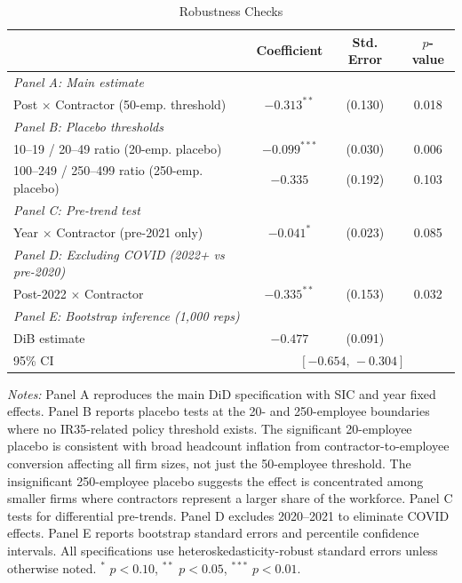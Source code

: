 \begin{table}[htbp]
\centering
\caption{Robustness Checks}
\label{tab:robust}
\begin{tabular}{lccc}
\hline\hline
 & Coefficient & Std. Error & $p$-value \\
\hline
\textit{Panel A: Main estimate} & & & \\
Post $\times$ Contractor (50-emp. threshold) & $-0.313^{**}$ & (0.130) & 0.018 \\[6pt]
\textit{Panel B: Placebo thresholds} & & & \\
10--19 / 20--49 ratio (20-emp. placebo) & $-0.099^{***}$ & (0.030) & 0.006 \\
100--249 / 250--499 ratio (250-emp. placebo) & $-0.335$ & (0.192) & 0.103 \\[6pt]
\textit{Panel C: Pre-trend test} & & & \\
Year $\times$ Contractor (pre-2021 only) & $-0.041^{*}$ & (0.023) & 0.085 \\[6pt]
\textit{Panel D: Excluding COVID (2022+ vs pre-2020)} & & & \\
Post-2022 $\times$ Contractor & $-0.335^{**}$ & (0.153) & 0.032 \\[6pt]
\textit{Panel E: Bootstrap inference (1,000 reps)} & & & \\
DiB estimate & $-0.477$ & (0.091) & \\
95\% CI & \multicolumn{3}{c}{$[-0.654, \, -0.304]$} \\
\hline\hline
\end{tabular}
\begin{tablenotes}
\item \textit{Notes:} Panel A reproduces the main DiD specification with SIC and year fixed effects. Panel B reports placebo tests at the 20- and 250-employee boundaries where no IR35-related policy threshold exists. The significant 20-employee placebo is consistent with broad headcount inflation from contractor-to-employee conversion affecting all firm sizes, not just the 50-employee threshold. The insignificant 250-employee placebo suggests the effect is concentrated among smaller firms where contractors represent a larger share of the workforce. Panel C tests for differential pre-trends. Panel D excludes 2020--2021 to eliminate COVID effects. Panel E reports bootstrap standard errors and percentile confidence intervals. All specifications use heteroskedasticity-robust standard errors unless otherwise noted. $^{*}$ $p<0.10$, $^{**}$ $p<0.05$, $^{***}$ $p<0.01$.
\end{tablenotes}
\end{table}
